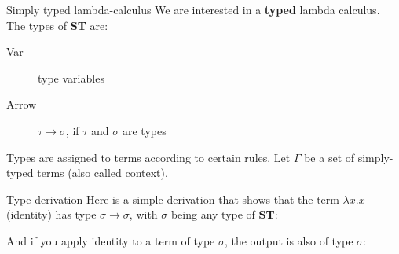 \documentclass[10pt]{beamer}
\begin{document}
\begin{frame}{Simply typed lambda-calculus}
       We are interested in a {\bf typed} lambda calculus. The types of {\bf ST} are:
        \begin{description}
     \item[Var] type variables 
     \item[Arrow] $\tau \rightarrow \sigma$, if $\tau$ and $\sigma$ are types
       \end{description}
       Types are assigned to terms according to certain rules. Let $\Gamma$ be a set of simply-typed terms (also called context). 
       \begin{prooftree}
                 \end{prooftree}

         \begin{prooftree}
         \end{prooftree}

         \begin{prooftree}
         \end{prooftree}
\end{frame}
\begin{frame}{Type derivation}
         Here is a simple derivation that shows that the term $\lambda x. x$ (identity) has type $\sigma \rightarrow \sigma$, with $\sigma$ being any type of {\bf ST}: \begin{prooftree}
         \end{prooftree}

And if you apply identity to a term of type $\sigma$, the output is also of type $\sigma$:

\begin{prooftree}
         \end{prooftree}
         \end{frame}
         
\end{document}
